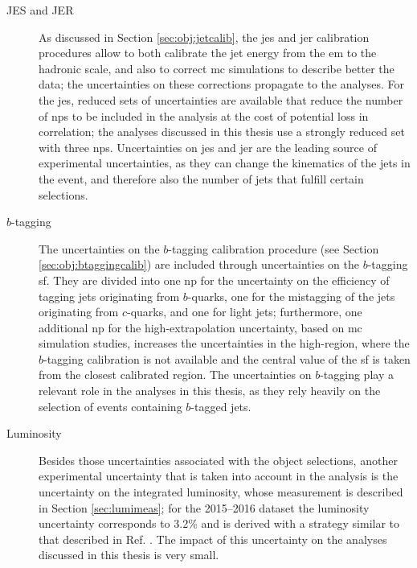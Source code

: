 \begin{description}

\item[JES and JER] As discussed in Section \ref{sec:obj:jetcalib}, the \gls{jes} and \gls{jer} calibration procedures allow to both calibrate the jet energy from the \gls{em} to the
hadronic scale, and also to correct \gls{mc} simulations to describe better the data; the uncertainties on these corrections propagate to the analyses. 
For the \gls{jes}, reduced sets of uncertainties are available that reduce the number of \glspl{np} to be included in the analysis at the cost of potential loss in correlation; 
the analyses discussed in this thesis use a strongly reduced set with three \glspl{np}. 
Uncertainties on \gls{jes} and \gls{jer} are the leading source of experimental uncertainties, as they can change the kinematics of the jets in the event, and therefore also the number
of jets that fulfill certain selections.

\item[$b$-tagging] The uncertainties on the $b$-tagging calibration procedure (see Section \ref{sec:obj:btaggingcalib}) are included through uncertainties on the $b$-tagging \gls{sf}. 
They are divided into one \gls{np} for the uncertainty on the efficiency of tagging jets originating from $b$-quarks, 
one for the mistagging of the jets originating from 
$c$-quarks, and one for light jets; 
furthermore, one additional \gls{np} for the high-\pt extrapolation uncertainty, based on \gls{mc} simulation studies, 
increases the uncertainties in the high-\pt region, where the $b$-tagging calibration is not available and the central 
value of the \gls{sf} is taken from the closest calibrated \pt region. 
The uncertainties on $b$-tagging play a relevant role in the analyses in this thesis, as they rely heavily on the selection of events containing $b$-tagged jets.

\item[Luminosity] Besides those uncertainties associated with the object selections, 
another experimental uncertainty that is taken into account in the analysis is 
the uncertainty on the integrated luminosity, whose measurement is described in Section \ref{sec:lumimeas}; for the 2015--2016 dataset the luminosity uncertainty corresponds 
to 3.2\% and is derived with a strategy similar to that described in Ref. \cite{Aaboud:2016hhf}. The impact of this uncertainty on the analyses discussed in this thesis is very small.

\end{description}


